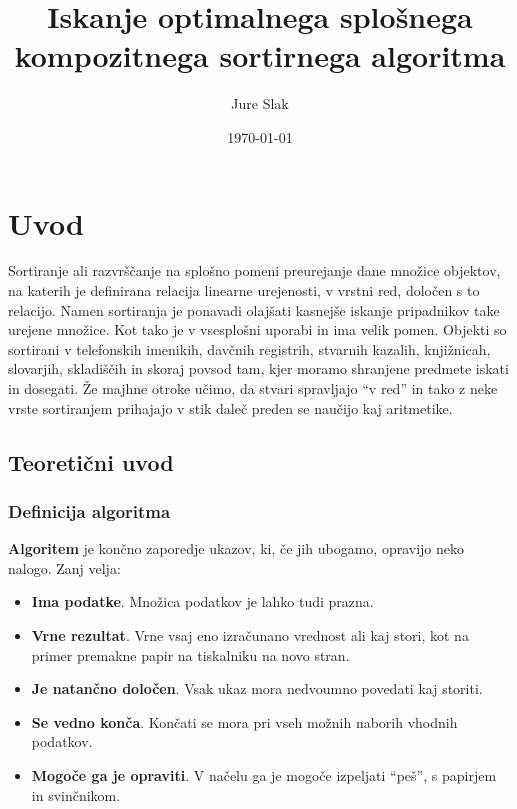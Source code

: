 \documentclass[a4paper,oneside]{article}
\title{Iskanje optimalnega splošnega kompozitnega sortirnega algoritma}
\author{Jure Slak}
\date{\today}
\begin{document}
\addto\captionsslovene {
\renewcommand\bibname{}
}
\renewcommand\refname{}


\maketitle
\thispagestyle{empty}
\pagebreak

\tableofcontents
\pagebreak

\section{Uvod}

Sortiranje ali razvrščanje na splošno pomeni preurejanje dane množice objektov, na katerih
je definirana relacija linearne urejenosti, v vrstni red, določen s to relacijo.
Namen sortiranja je ponavadi olajšati kasnejše iskanje pripadnikov take urejene množice. Kot tako je
v vsesplošni uporabi in ima velik pomen. Objekti so sortirani v telefonskih imenikih,
davčnih registrih, stvarnih kazalih, knjižnicah, slovarjih, skladiščih in skoraj povsod tam,
kjer moramo shranjene predmete iskati in dosegati. Že majhne otroke učimo, da stvari spravljajo
``v red'' in tako z neke vrste sortiranjem prihajajo v stik daleč preden se naučijo kaj
aritmetike.

\subsection{Teoretični uvod}



\subsubsection{Definicija algoritma}


\textbf{Algoritem} je končno zaporedje ukazov, ki, če jih ubogamo, opravijo neko nalogo.
Zanj velja:
\begin{itemize}
  \item \textbf{Ima podatke}. Množica podatkov je lahko tudi prazna.
  \item \textbf{Vrne rezultat}. Vrne vsaj eno izračunano vrednost ali kaj stori, kot na primer
    premakne papir na tiskalniku na novo stran.
  \item \textbf{Je natančno določen}. Vsak ukaz mora nedvoumno povedati kaj storiti.
  \item \textbf{Se vedno konča}. Končati se mora pri vseh možnih naborih vhodnih podatkov.
  \item \textbf{Mogoče ga je opraviti}. V načelu ga je mogoče izpeljati ``peš'', s papirjem in
    svinčnikom.
\end{itemize}
\end{document}
